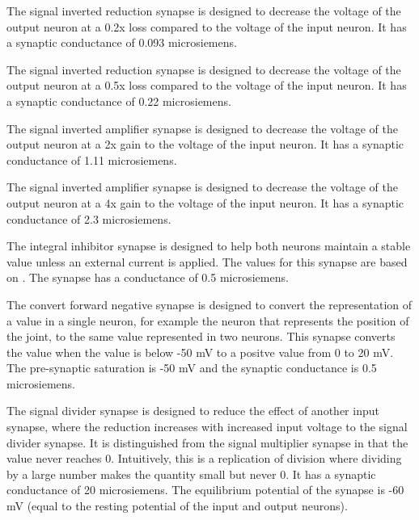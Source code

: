 
The signal inverted reduction synapse is designed to decrease the voltage of
the output 
neuron at a 0.2x loss compared to the voltage of the input neuron. It has a 
synaptic conductance of 0.093 microsiemens.


The signal inverted reduction synapse is designed to decrease the voltage of
the output 
neuron at a 0.5x loss compared to the voltage of the input neuron. It has a 
synaptic conductance of 0.22 microsiemens.


The signal inverted amplifier synapse is designed to decrease the voltage of
the output 
neuron at a 2x gain to the voltage of the input neuron. It has a synaptic 
conductance of 1.11 microsiemens.


The signal inverted amplifier synapse is designed to decrease the voltage of
the output 
neuron at a 4x gain to the voltage of the input neuron. It has a synaptic 
conductance of 2.3 microsiemens.


The integral inhibitor synapse is designed to help both neurons maintain a 
stable value unless an external current is applied. The values for this
synapse are based on \cite{NickFunctionalSubnetwork}. The synapse has a  
conductance of 0.5 microsiemens.


The convert forward negative synapse is designed to convert the representation
of a value in a single neuron, for example the neuron that represents the 
position of the joint, to the same value represented in two neurons. This
synapse converts the value when the value is below -50 mV to a positve value 
from 0 to 20 mV. The pre-synaptic
saturation is -50 mV and the synaptic conductance is 0.5 microsiemens.


The signal divider synapse is designed to reduce the effect of another input
synapse, where the reduction increases with increased input voltage to the
signal divider synapse. It is distinguished from the signal multiplier synapse
in that the value never reaches 0. Intuitively, this is a replication of 
division where dividing by a large number makes the quantity small but never 0.
It has a synaptic conductance of 20 microsiemens. The equilibrium potential of
the synapse is -60 mV (equal to the resting potential of the input and output
neurons).

